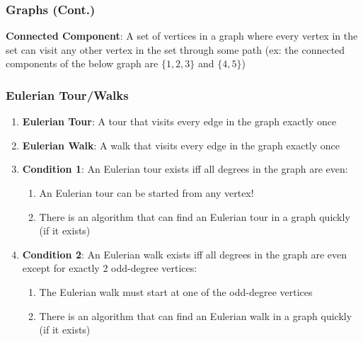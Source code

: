 \documentclass{beamer}
\begin{document}
\begin{frame}
    \frametitle{Graphs (Cont.)}
    {\bf Connected Component}: A set of vertices in a graph where every vertex in the set can visit any other vertex in the set through some path (ex: the connected components of the below graph are $\{1,2,3\}$ and $\{4,5\}$)\\
\end{frame}

\begin{frame}
    \frametitle{Eulerian Tour/Walks}
    \begin{enumerate}[-]
        \item {\bf Eulerian Tour}: A tour that visits every edge in the graph exactly once
        \item {\bf Eulerian Walk}: A walk that visits every edge in the graph exactly once
        \item {\bf Condition 1}: An Eulerian tour exists iff all degrees in the graph are even:
        \begin{enumerate}[-]
            \item An Eulerian tour can be started from any vertex!
            \item There is an algorithm that can find an Eulerian tour in a graph quickly (if it exists)
        \end{enumerate}
        \item {\bf Condition 2}: An Eulerian walk exists iff all degrees in the graph are even except for exactly $2$ odd-degree vertices:
        \begin{enumerate}[-]
            \item The Eulerian walk must start at one of the odd-degree vertices
            \item There is an algorithm that can find an Eulerian walk in a graph quickly (if it exists)
        \end{enumerate}
    \end{enumerate}
\end{frame}
\end{document}
